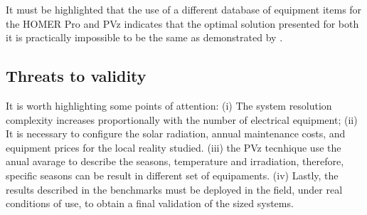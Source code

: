 \documentclass[review]{elsarticle}
\begin{document}
It must be highlighted that the use of a different database of equipment items for the HOMER Pro and PVz indicates that the optimal solution presented for both it is practically impossible to be the same as demonstrated by \cite{Alsadi2018}. 

\subsection{Threats to validity} 

It is worth highlighting some points of attention: (i) The system resolution complexity increases proportionally with the number of electrical equipment; (ii) It is necessary to configure the solar radiation, annual maintenance costs, and equipment prices for the local reality studied. (iii) the PVz tecnhique use the anual avarage to describe the seasons, temperature and irradiation, therefore, specific seasons can be result in different set of equipaments. (iv) Lastly, the results described in the benchmarks must be deployed in the field, under real conditions of use, to obtain a final validation of the sized systems.
\end{document}
